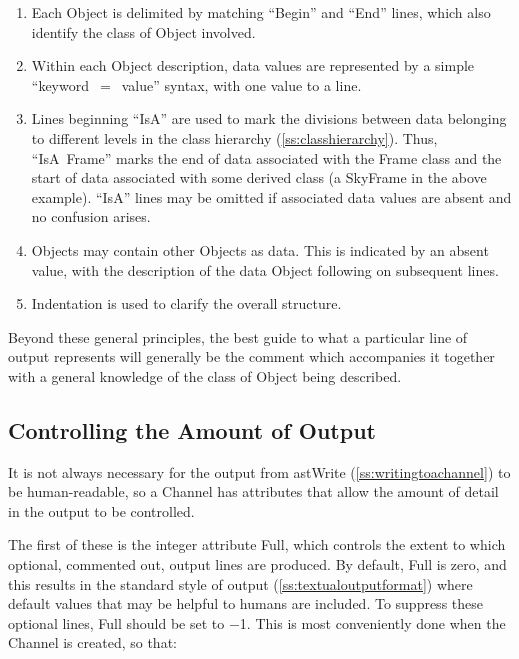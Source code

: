 \documentclass[twoside,11pt]{article}
\newcommand{\htmlref}[2]{#1}
\newcommand{\appref}[1]{Appendix~\ref{#1}}
\newcommand{\secref}[1]{\S\ref{#1}}
\renewcommand{\appref}[1]{\ref{#1}}
\renewcommand{\secref}[1]{\ref{#1}}
\begin{document}
\begin{enumerate}
\item Each Object is delimited by matching ``Begin'' and ``End''
lines, which also identify the class of Object involved.

\item Within each Object description, data values are represented
by a simple ``keyword~$=$~value'' syntax, with one value to a line.

\item Lines beginning ``IsA'' are used to mark the divisions between
data belonging to different levels in the class hierarchy
(\appref{ss:classhierarchy}). Thus, ``IsA~\htmlref{Frame}{Frame}'' marks the end of data
associated with the Frame class and the start of data associated with
some derived class (a SkyFrame in the above example). ``IsA'' lines
may be omitted if associated data values are absent and no confusion
arises.

\item Objects may contain other Objects as data. This is
indicated by an absent value, with the description of the data
Object following on subsequent lines.

\item Indentation is used to clarify the overall structure.
\end{enumerate}

Beyond these general principles, the best guide to what a particular
line of output represents will generally be the comment which
accompanies it together with a general knowledge of the class of
Object being described.

\subsection{\label{ss:controllingchanneloutput}Controlling the Amount of Output}

It is not always necessary for the output from \htmlref{astWrite}{astWrite}
(\secref{ss:writingtoachannel}) to be human-readable, so a \htmlref{Channel}{Channel} has
attributes that allow the amount of detail in the output to be
controlled.

The first of these is the integer attribute \htmlref{Full}{Full}, which controls the
extent to which optional, commented out, output lines are produced. By
default, Full is zero, and this results in the standard style of
output (\secref{ss:textualoutputformat}) where default values that may
be helpful to humans are included. To suppress these optional lines,
Full should be set to $-$1. This is most conveniently done when the
Channel is created, so that:
\end{document}
